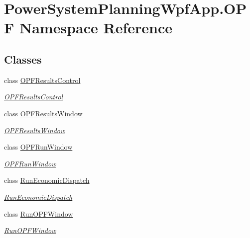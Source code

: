 \hypertarget{namespace_power_system_planning_wpf_app_1_1_o_p_f}{}\section{Power\+System\+Planning\+Wpf\+App.\+O\+PF Namespace Reference}
\label{namespace_power_system_planning_wpf_app_1_1_o_p_f}
\subsection*{Classes}
\begin{DoxyCompactItemize}
\item 
class \hyperlink{class_power_system_planning_wpf_app_1_1_o_p_f_1_1_o_p_f_results_control}{O\+P\+F\+Results\+Control}
\begin{DoxyCompactList}\small\item\em \hyperlink{class_power_system_planning_wpf_app_1_1_o_p_f_1_1_o_p_f_results_control}{O\+P\+F\+Results\+Control} \end{DoxyCompactList}\item 
class \hyperlink{class_power_system_planning_wpf_app_1_1_o_p_f_1_1_o_p_f_results_window}{O\+P\+F\+Results\+Window}
\begin{DoxyCompactList}\small\item\em \hyperlink{class_power_system_planning_wpf_app_1_1_o_p_f_1_1_o_p_f_results_window}{O\+P\+F\+Results\+Window} \end{DoxyCompactList}\item 
class \hyperlink{class_power_system_planning_wpf_app_1_1_o_p_f_1_1_o_p_f_run_window}{O\+P\+F\+Run\+Window}
\begin{DoxyCompactList}\small\item\em \hyperlink{class_power_system_planning_wpf_app_1_1_o_p_f_1_1_o_p_f_run_window}{O\+P\+F\+Run\+Window} \end{DoxyCompactList}\item 
class \hyperlink{class_power_system_planning_wpf_app_1_1_o_p_f_1_1_run_economic_dispatch}{Run\+Economic\+Dispatch}
\begin{DoxyCompactList}\small\item\em \hyperlink{class_power_system_planning_wpf_app_1_1_o_p_f_1_1_run_economic_dispatch}{Run\+Economic\+Dispatch} \end{DoxyCompactList}\item 
class \hyperlink{class_power_system_planning_wpf_app_1_1_o_p_f_1_1_run_o_p_f_window}{Run\+O\+P\+F\+Window}
\begin{DoxyCompactList}\small\item\em \hyperlink{class_power_system_planning_wpf_app_1_1_o_p_f_1_1_run_o_p_f_window}{Run\+O\+P\+F\+Window} \end{DoxyCompactList}\end{DoxyCompactItemize}
